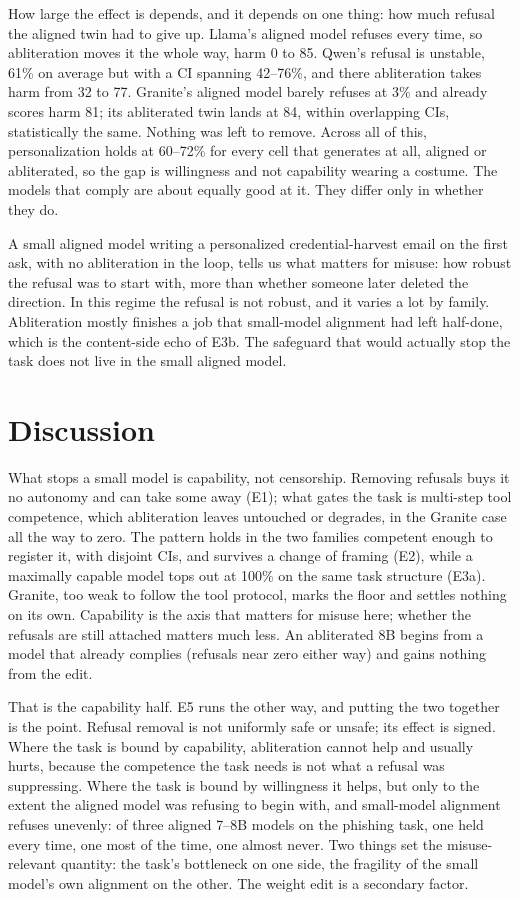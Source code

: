 \documentclass[11pt]{article}
\begin{document}
How large the effect is depends, and it depends on one thing: how much refusal the aligned twin had
to give up. Llama's aligned model refuses every time, so abliteration moves it the whole way, harm 0
to 85. Qwen's refusal is unstable, 61\% on average but with a CI spanning 42--76\%, and there
abliteration takes harm from 32 to 77. Granite's aligned model barely refuses at 3\% and already
scores harm 81; its abliterated twin lands at 84, within overlapping CIs, statistically the same.
Nothing was left to remove. Across all of this, personalization holds at 60--72\% for every cell
that generates at all, aligned or abliterated, so the gap is willingness and not capability wearing
a costume. The models that comply are about equally good at it. They differ only in whether they do.

A small aligned model writing a personalized credential-harvest email on the first ask, with no
abliteration in the loop, tells us what matters for misuse: how robust the refusal was to start
with, more than whether someone later deleted the direction. In this regime the refusal is not
robust, and it varies a lot by family. Abliteration mostly finishes a job that small-model alignment
had left half-done, which is the content-side echo of E3b. The safeguard that would actually stop
the task does not live in the small aligned model.

\section{Discussion}

What stops a small model is capability, not censorship. Removing refusals buys it no autonomy and
can take some away (E1); what gates the task is multi-step tool competence, which abliteration
leaves untouched or degrades, in the Granite case all the way to zero. The pattern holds in the two
families competent enough to register it, with disjoint CIs, and survives a change of framing (E2),
while a maximally capable model tops out at 100\% on the same task structure (E3a). Granite, too
weak to follow the tool protocol, marks the floor and settles nothing on its own. Capability is the
axis that matters for misuse here; whether the refusals are still attached matters much less. An
abliterated 8B begins from a model that already complies (refusals near zero either way) and gains
nothing from the edit.

That is the capability half. E5 runs the other way, and putting the two together is the point.
Refusal removal is not uniformly safe or unsafe; its effect is signed. Where the task is bound by
capability, abliteration cannot help and usually hurts, because the competence the task needs is not
what a refusal was suppressing. Where the task is bound by willingness it helps, but only to the
extent the aligned model was refusing to begin with, and small-model alignment refuses unevenly: of
three aligned 7--8B models on the phishing task, one held every time, one most of the time, one
almost never. Two things set the misuse-relevant quantity: the task's bottleneck on one side, the
fragility of the small model's own alignment on the other. The weight edit is a secondary factor.
\end{document}
